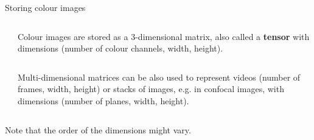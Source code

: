 \documentclass[9pt, aspectratio=169]{beamer}
\begin{document}
\begin{frame}
    {Storing colour images}
    \begin{columns}
        \begin{column}{.3\textwidth}
        \end{column}
        \begin{column}{0.7\textwidth}
            Colour images are stored as a 3-dimensional matrix, also called a \textbf{tensor} with dimensions (number of colour channels, width, height).
        \end{column}
    \end{columns}
    \vspace{2em}
    \pause
    \begin{columns}
        \begin{column}{0.3\textwidth}
        \end{column}
        \begin{column}{0.7\textwidth}
            Multi-dimensional matrices can be also used to represent videos (number of frames, width, height) or stacks of images, e.g. in confocal images, with dimensions (number of planes, width, height).
        \end{column}
    \end{columns}

    \vspace{1em}
    Note that the order of the dimensions might vary.
\end{frame}
\end{document}
